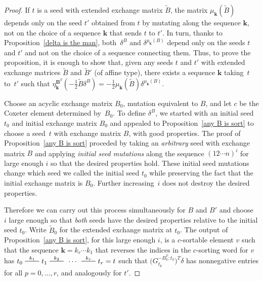 \documentclass{amsart}
\theoremstyle{definition}
\theoremstyle{remark}
\numberwithin{equation}{section}
\newcommand{\edge}{\,\,\rule[2.7pt]{20pt}{0.5pt}\,\,}
\newcommand{\0}{{\mathbf{0}}}
\newcommand{\kk}{{\boldsymbol{k}}}
\newcommand{\tB}{{\widetilde{B}}}
\newcommand{\BB}{\mathbf{B}}
\begin{document}
\begin{proof}%
If $t$ is a seed with extended exchange matrix $\tB$, the matrix $\mu_\kk(\tB)$ depends only on the seed $t'$ obtained from $t$ by mutating along the sequence $\kk$, not on the choice of a sequence $\kk$ that sends $t$ to $t'$.
In turn, thanks to Proposition~\ref{delta is the man}, both~$\delta^B$ and $\delta^{\mu_\kk(B)}$ depend only on the seeds $t$ and $t'$ and not on the choice of a sequence connecting them.
Thus, to prove the proposition, it is enough to show that, given any seeds $t$ and $t'$ with extended exchange matrices $\tB$ and $\tB'$ (of affine type), there exists a sequence $\kk$ taking~$t$ to~$t'$ such that $\eta^{\BB^T}_\kk(-\frac12\tB\delta^B)=-\frac12\mu_\kk(\tB)\delta^{\mu_\kk(B)}$.

Choose an acyclic exchange matrix $B_0$, mutation equivalent to $B$, and let $c$ be the Coxeter element determined by~$B_0$.
To define $\delta^B$, we started with an initial seed~$t_0$ and initial exchange matrix $B_0$ and appealed to Proposition~\ref{any B is sort} to choose a seed~$t$ with exchange matrix $B$, with good properties.
The proof of Proposition~\ref{any B is sort} proceded by taking an \emph{arbitrary} seed with exchange matrix $B$ and applying \emph{initial seed mutations} along the sequence $(12\cdots n)^i$ for large enough $i$ so that the desired properties hold. 
These initial seed mutations change which seed we called the initial seed $t_0$ while preserving the fact that the initial exchange matrix is $B_0$.
Further increasing~$i$ does not destroy the desired properties.

Therefore we can carry out this process simultaneously for $B$ and $B'$ and choose~$i$ large enough so that \emph{both} seeds have the desired properties relative to the initial seed $t_0$.
Write $\tB_0$ for the extended exchange matrix at $t_0$.
The output of Proposition~\ref{any B is sort}, for this large enough $i$, is a $c$-sortable element $v$ such that the sequence $\kk=k_r\cdots k_1$ that reverses the indices in the $c$-sorting word for $v$ has ${t_0\overset{k_1}{\edge}t_1\overset{k_2}{\edge}\,\cdots\,\overset{k_r}{\edge}t_r=t}$ such that $\bigl(G_{t_p}^{-B_0^T;t_0}\bigr)^T\delta$ has nonnegative entries for all ${p=0,\ldots,r}$, and analogously for $t'$.


\end{proof}
\end{document}
